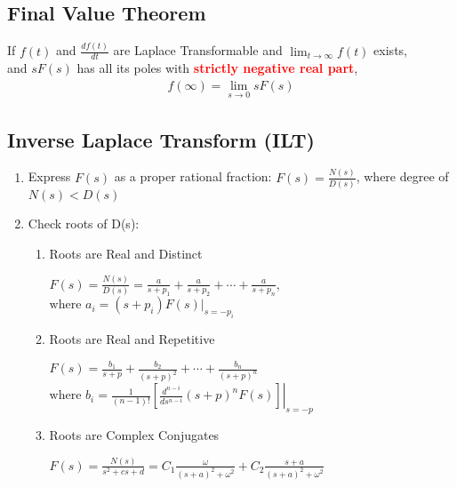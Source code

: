 \documentclass[a4paper]{article}
\begin{document}
\subsection{Final Value Theorem}
If $f(t)$ and $\frac{df(t)}{dt}$ are Laplace Transformable and $\displaystyle\lim_{t\rightarrow\infty} f(t)$ exists,\\
and $sF(s)$ has all its poles with \textcolor{red}{\textbf{strictly negative real part}},
\begin{align*}
    f(\infty) = \lim_{s\rightarrow0} sF(s)
\end{align*}
\subsection{Inverse Laplace Transform (ILT)}
\begin{enumerate}
    \item Express $F(s)$ as a proper rational fraction: $\displaystyle F(s) = \frac{N(s)}{D(s)}$, where degree of $N(s) < D(s)$
    \item Check roots of D(s):
    \begin{enumerate}[label=\large\protect\textcircled{\small\Alph*}]
        \item Roots are Real and Distinct
        \begin{center}
        $\displaystyle F(s) = \frac{N(s)}{D(s)} = \frac{a}{s+p_1}+\frac{a}{s+p_2}+\cdots+\frac{a}{s+p_n},$
        \vspace{0.25cm}\\ 
        $\text{where } a_i = (s+p_i)F(s)|_{s=-p_i}$
        \end{center}
        \item Roots are Real and Repetitive
        \begin{center}
            $\displaystyle F(s) = \frac{b_1}{s+p}+\frac{b_2}{(s+p)^2}+\cdots+\frac{b_n}{(s+p)^n}$
            \vspace{0.25cm}\\ 
            $\text{where }b_i = \displaystyle\frac{1}{(n-1)!}\left[\left.\frac{d^{n-i}}{ds^{n-i}}(s+p)^n F(s)\right]\right|_{s=-p}$
        \end{center}
        \item Roots are Complex Conjugates
        \begin{center}
            $\displaystyle F(s) = \frac{N(s)}{s^2+cs+d} = C_1\frac{\omega}{(s+a)^2+\omega^2}+C_2\frac{s+a}{(s+a)^2+\omega^2}$
            \vspace{0.25cm}\\

\end{center}
\end{enumerate}
\end{enumerate}
\end{document}
